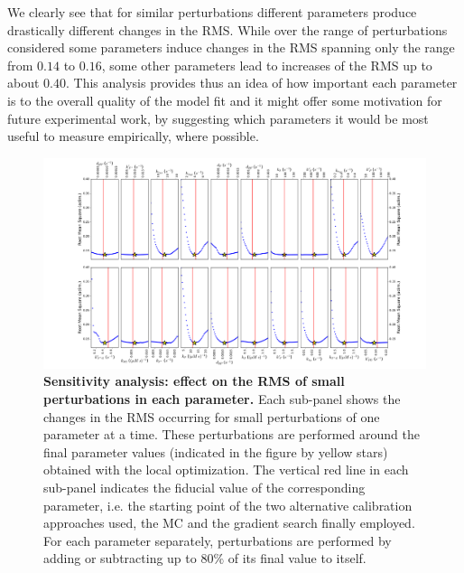 \documentclass[oneside, 10pt, a4paper, twocolumn]{article}
\begin{document}
We clearly see that for similar perturbations different parameters produce drastically different changes in the RMS. While over the range of perturbations considered some parameters induce changes in the RMS spanning only the range from $0.14$ to $0.16$, some other parameters lead to increases of the RMS up to about $0.40$. This analysis provides thus an idea of how important each parameter is to the overall quality of the model fit and it might offer some motivation for future experimental work, by suggesting which parameters it would be most useful to measure empirically, where possible. %


\begin{figure}[h!]
\centering
\includegraphics[width=\textwidth]{Figure10_SupMat.pdf}
\caption{\small{{\textbf{Sensitivity analysis: effect on the RMS of small perturbations in each parameter.} Each sub-panel shows the changes in the RMS occurring for small perturbations of one parameter at a time. These perturbations are performed around the final parameter values (indicated in the figure by yellow stars) obtained with the local optimization. The vertical red line in each sub-panel indicates the fiducial value of the corresponding parameter, i.e. the starting point of the two alternative calibration approaches used, the MC and the gradient search finally employed. For each parameter separately, perturbations are performed by adding or subtracting up to $80\%$ of its final value to itself.}}}
\label{Figure10label}
\end{figure}
 

\end{document}
